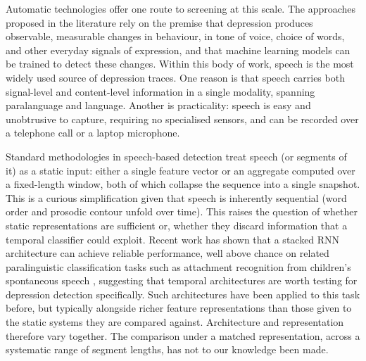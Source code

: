 \documentclass{mproj}
\begin{document}
Automatic technologies offer one route to screening at this scale. The approaches proposed in the literature rely on the premise that depression produces observable, measurable changes in behaviour, in tone of voice, choice of words, and other everyday signals of expression, and that machine learning models can be trained to detect these changes. Within this body of work, speech is the most widely used source of depression traces. One reason is that speech carries both signal-level and content-level information in a single modality, spanning paralanguage and language. Another is practicality: speech is easy and unobtrusive to capture, requiring no specialised sensors, and can be recorded over a telephone call or a laptop microphone.

Standard methodologies in speech-based detection treat speech (or segments of it) as a static input: either a single feature vector or an aggregate computed over a fixed-length window, both of which collapse the sequence into a single snapshot. This is a curious simplification given that speech is inherently sequential (word order and prosodic contour unfold over time). This raises the question of whether static representations are sufficient or, whether they discard information that a temporal classifier could exploit. Recent work has shown that a stacked RNN architecture can achieve reliable performance, well above chance on related paralinguistic classification tasks such as attachment recognition from children's spontaneous speech \cite{alsofyani2021}, suggesting that temporal architectures are worth testing for depression detection specifically. Such architectures have been applied to this task before, but typically alongside richer feature representations than those given to the static systems they are compared against. Architecture and representation therefore vary together. The comparison under a matched representation, across a systematic range of segment lengths, has not to our knowledge been made.
\end{document}
